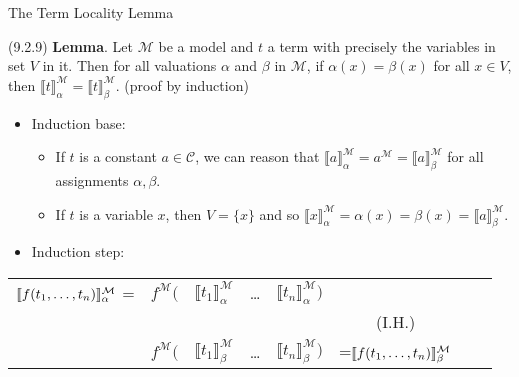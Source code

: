 \begin{frame}{The Term Locality Lemma}

 (9.2.9) \textbf{Lemma}. Let $\mathcal{M}$ be a model and $t$ a term with precisely the variables in set $V$ in it. Then for all valuations $\alpha$ and $\beta$ in $\mathcal{M}$, if $\alpha(x)=\beta(x)$ for all $x\in V$, then $\llbracket t\rrbracket_\alpha^\mathcal{M}=\llbracket t\rrbracket_\beta^\mathcal{M}$. (proof by induction)
		
\medskip

\begin{itemize}
\itemsep=16pt

	\item Induction base:
	
	\medskip
	
	\begin{itemize}
	\itemsep=10pt
	
	\item If $t$ is a constant $a\in\mathcal{C}$, we can reason that $\llbracket a\rrbracket^\mathcal{M}_\alpha=a^\mathcal{M}=\llbracket a\rrbracket^\mathcal{M}_\beta$ for all assignments $\alpha,\beta$. 
	
	\item If $t$ is a variable $x$, then $V=\{x\}$ and so $\llbracket x\rrbracket^\mathcal{M}_\alpha=\alpha(x)=\beta(x)=\llbracket a\rrbracket^\mathcal{M}_\beta$. 
	
	\end{itemize}
	
	\item Induction step:

	\end{itemize}
	\itemsep=10pt

	{\small
	\begin{center}
		\begin{tabular}{c c c c c c ll}
		$\llbracket f(t_1, \mathellipsis, t_n)\rrbracket^\mathcal{M}_\alpha$ = & $f^\mathcal{M}($ & $\llbracket t_1\rrbracket^\mathcal{M}_\alpha$ &  \dots & $\llbracket t_n\rrbracket^\mathcal{M}_\alpha)$\\
		 & & \rotatebox{90}{=} & & \rotatebox{90}{=} &(I.H.)\\
		& $f^\mathcal{M}($ & $\llbracket t_1\rrbracket^\mathcal{M}_\beta$ &  \dots & $\llbracket t_n\rrbracket^\mathcal{M}_\beta)$&=$\llbracket f(t_1, \mathellipsis, t_n)\rrbracket^\mathcal{M}_\beta$ \\
		\end{tabular}
		\end{center}}


\end{frame}

